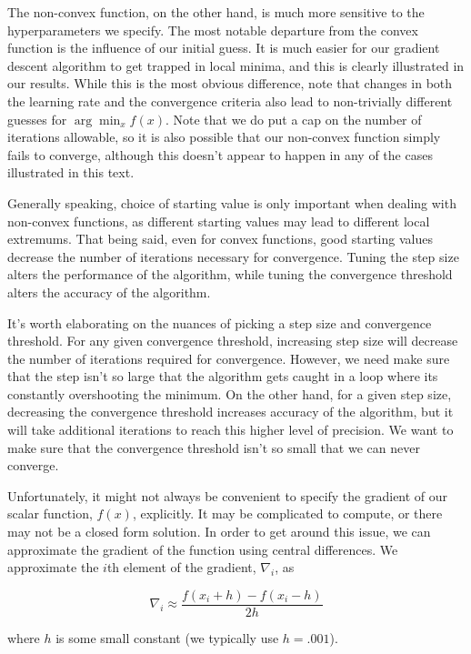 \documentclass[10pt]{article}
\begin{document}
The non-convex function, on the other hand, is much more sensitive to the hyperparameters we specify. The most notable departure from the convex function is the influence of our initial guess. It is much easier for our gradient descent algorithm to get trapped in local minima, and this is clearly illustrated in our results. While this is the most obvious difference, note that changes in both the learning rate and the convergence criteria also lead to non-trivially different guesses for $\arg\min_x {f(x)}$. Note that we do put a cap on the number of iterations allowable, so it is also possible that our non-convex function simply fails to converge, although this doesn't appear to happen in any of the cases illustrated in this text.

Generally speaking, choice of starting value is only important when dealing with non-convex functions, as different starting values may lead to different local extremums. That being said, even for convex functions, good starting values decrease the number of iterations necessary for convergence. Tuning the step size alters the performance of the algorithm, while tuning the convergence threshold alters the accuracy of the algorithm.

It's worth elaborating on the nuances of picking a step size and convergence threshold. For any given convergence threshold, increasing step size will decrease the number of iterations required for convergence. However, we need make sure that the step isn't so large that the algorithm gets caught in a loop where its constantly overshooting the minimum. On the other hand, for a given step size, decreasing the convergence threshold increases accuracy of the algorithm, but it will take additional iterations to reach this higher level of precision. We want to make sure that the convergence threshold isn't so small that we can never converge.

Unfortunately, it might not always be convenient to specify the gradient of our scalar function, $f(x)$, explicitly. It may be complicated to compute, or there may not be a closed form solution. In order to get around this issue, we can approximate the gradient of the function using central differences. We approximate the $i$th element of the gradient, $\nabla_i$, as

\begin{equation}
\nabla_i \approx \frac{f(x_i+h) - f(x_i-h)}{2h}
\end{equation} 

\noindent where $h$ is some small constant (we typically use $h = .001$).
\end{document}
